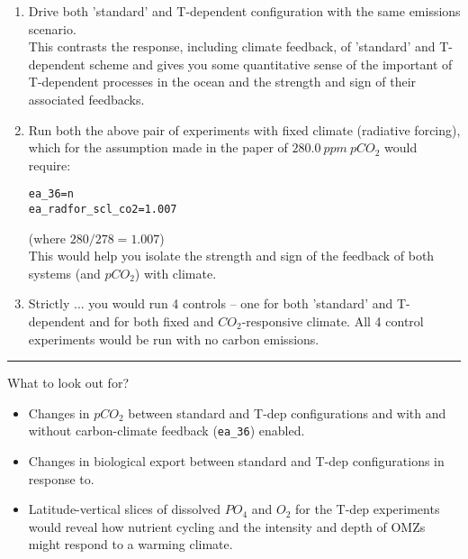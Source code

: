 \begin{enumerate}[noitemsep]
\vspace{1mm}
\item Drive both 'standard' and T-dependent configuration with the same emissions scenario.
\\This contrasts the response, including climate feedback, of 'standard' and T-dependent scheme and gives you some quantitative sense of the important of T-dependent processes in the ocean and the strength and sign of their associated feedbacks.
\vspace{1mm}
\item Run both the above pair of experiments with fixed climate (radiative forcing), which for the assumption made in the paper of $280.0\:ppm\:pCO_{2}$ would require:
\vspace{-1mm}\small\begin{verbatim}
ea_36=n
ea_radfor_scl_co2=1.007
\end{verbatim}\normalsize\vspace{-1mm}
(where $280/278 = 1.007$)
\\This would help you isolate the strength and sign of the feedback of both systems (and $pCO_{2}$) with climate.
\vspace{1mm}
\item Strictly ... you would run 4 controls -- one for both 'standard' and T-dependent and for both fixed and $CO_{2}$-responsive climate. All 4 control experiments would be run with no carbon emissions.
\end{enumerate}

\vspace{1mm} \noindent\rule{4cm}{0.1mm} \vspace{2mm}

\noindent What to look out for?

\begin{itemize}[noitemsep]
\vspace{1mm}
\item Changes in $pCO_{2}$ between standard and T-dep configurations and with and without carbon-climate feedback (\texttt{\small ea\_36}) enabled.
\vspace{1mm}
\item Changes in biological export between standard and T-dep configurations in response to.
\vspace{1mm}
\item Latitude-vertical slices of dissolved $PO_{4}$ and $O_{2}$ for the T-dep experiments would reveal how nutrient cycling and the intensity and depth of OMZs might respond to a warming climate. 
\end{itemize}

